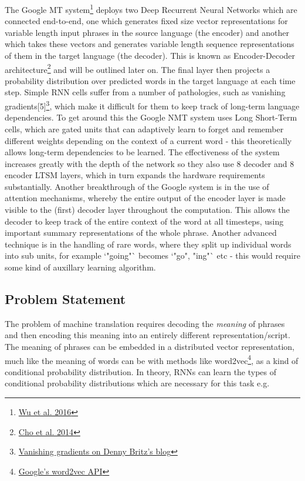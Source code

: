 \documentclass[]{article}
\begin{document}
The Google MT system\footnote{\href{https://arxiv.org/pdf/1609.08144.pdf}{Wu et al. 2016}} deploys two Deep Recurrent Neural Networks which are connected end-to-end, one which generates fixed size vector representations for variable length input phrases in the source language (the encoder) and another which takes these vectors and generates variable length sequence representations of them in the target language (the decoder). This is known as Encoder-Decoder architecture\footnote{\label{hyp:cho}\href{https://arxiv.org/pdf/1406.1078.pdf}{Cho et al. 2014}} and will be outlined later on. The final layer then projects a probability distribution over predicted words in the target language at each time step. Simple RNN cells suffer from a number of pathologies, such as vanishing gradients[5]\footnote{\href{http://www.wildml.com/2015/10/recurrent-neural-networks-tutorial-part-3-backpropagation-through-time-and-vanishing-gradients/}{Vanishing gradients on Denny Britz's blog}}, which make it difficult for them to keep track of long-term language dependencies. To get around this the Google NMT system uses Long Short-Term cells, which are gated units that can adaptively learn to forget and remember different weights depending on the context of a current word - this theoretically allows long-term dependencies to be learned. The effectiveness of the system increases greatly with the depth of the network so they also use 8 decoder and 8 encoder LTSM layers, which in turn expands the hardware requirements substantially. Another breakthrough of the Google system is in the use of attention mechanisms, whereby the entire output of the encoder layer is made visible to the (first) decoder layer throughout the computation. This allows the decoder to keep track of the entire context of the word at all timesteps, using important summary representations of the whole phrase. Another advanced technique is in the handling of rare words, where they split up individual words into sub units, for example `"going"` becomes `"go", "ing"` etc - this would require some kind of auxillary learning algorithm. 
\subsection{Problem Statement}
The problem of machine translation requires decoding the \textit{meaning} of phrases and then encoding this meaning into an entirely different representation/script. The meaning of phrases can be embedded in a distributed vector representation, much like the meaning of words can be with methods like word2vec\footnote{\href{https://code.google.com/archive/p/word2vec/}{Google's word2vec API}}, as a kind of conditional probability distribution. In theory, RNNs can learn the types of conditional probability distributions which are necessary for this task e.g.
\end{document}
